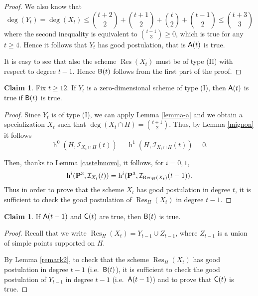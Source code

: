 \documentclass{amsart}
\theoremstyle{plain}
\theoremstyle{definition}
\newtheorem{claim}[theorem]{Claim}
\begin{document}
\begin{proof}
We also know that
\begin{equation}\label{stima}
\deg(Y_t)=\deg(X_t)\leq
\binom{t+2}{2}+\binom{t+1}{2}+\binom{t}{2}+\binom{t-1}{2}\leq \binom{t+3}{3}
\end{equation}
where the second inequality is equivalent to
$\binom{t-1}{3}\geq0$, which is
true for any $t\ge 4$. Hence it follows that $Y_t$ has good postulation,
that is ${\sf{{A}}}(t)$ is true.

It is easy to see that  also the scheme $\operatorname{Res}(X_t)$ must be of type
(II) with respect to degree $t-1$. Hence ${\sf{B}}(t)$ follows from the
first part of the proof.
\end{proof}

\begin{claim}\label{claim-a}
Fix $t\ge12$.
If $Y_t$ is a zero-dimensional scheme of type (I), then ${\sf{{A}}}(t)$ is
true if ${\sf{B}}(t)$ is true.
\end{claim}

\begin{proof}
Since $Y_t$ is of type (I), we can apply Lemma \ref{lemma-a} and we obtain a
specialization $X_t$  such that $\deg(X_t\cap H)=\binom{t+1}{2}$.
Thus, by Lemma \ref{mignon} it follows
$$\operatorname{h}^0(H,\mathcal {I}_{X_t\cap H}(t))=\operatorname{h}^1(H,\mathcal {I}_{X_t\cap H}(t))=0.$$

Then, thanks to Lemma \ref{castelnuovo}, it follows, for $i=0,1$,
$$\operatorname{h}^i({\bf {P}}^3,\mathcal {I}_{X_t}(t))= \operatorname{h}^i({\bf {P}}^3,\mathcal {I}_{\operatorname{Res}_H(X_t)}(t-1)).$$
Thus in order to prove that the
scheme $X_t$ has good postulation in degree $t$,
it is sufficient to check the good postulation of $\operatorname{Res}_H(X_t)$ in degree
$t-1$.
\end{proof}

\begin{claim}\label{claim-b}
If ${\sf{{A}}}(t-1)$ and ${\sf{C}}(t)$ are true, then ${\sf{B}}(t)$ is true.
\end{claim}

\begin{proof}
Recall that we write $\operatorname{Res}_H(X_t)=Y_{t-1}\cup Z_{t-1}$,
where $Z_{t-1}$ is a union of simple points supported on $H$.

By Lemma \ref{remark2}, to check that the scheme $\operatorname{Res}_H(X_t)$ has
good postulation in degree $t-1$ (i.e.\ ${\sf{B}}(t)$), it is sufficient
to check the good postulation of $Y_{t-1}$ in degree $t-1$ (i.e.\
${\sf{{A}}}(t-1)$) and to prove that ${\sf{C}}(t)$ is true.
\end{proof}
\end{document}
